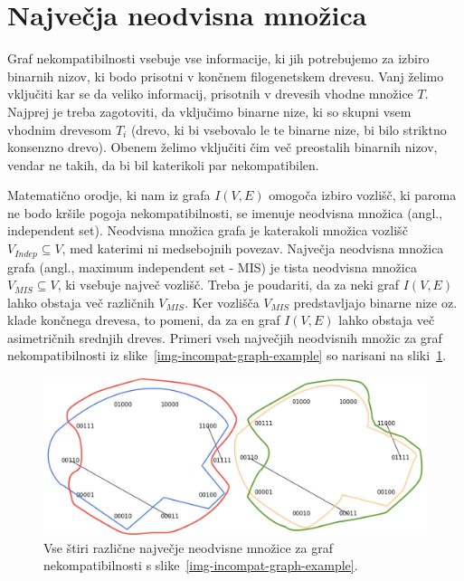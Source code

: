 \documentclass[a4paper, 12pt]{book}
\begin{document}
\section{Največja neodvisna množica}
Graf nekompatibilnosti vsebuje vse informacije, ki jih potrebujemo za izbiro 
binarnih nizov, ki bodo prisotni v končnem filogenetskem drevesu. Vanj želimo 
vključiti kar se da veliko informacij, prisotnih v drevesih vhodne množice $T$. 
Najprej je treba zagotoviti, da vključimo binarne nize, ki so skupni vsem 
vhodnim drevesom $T_i$ (drevo, ki bi vsebovalo le te binarne nize, bi bilo 
striktno konsenzno drevo). Obenem želimo vključiti čim več preostalih binarnih 
nizov, vendar ne takih, da bi bil katerikoli par nekompatibilen. 

Matematično orodje, ki nam iz grafa $I(V, E)$ omogoča izbiro vozlišč, ki paroma 
ne bodo kršile pogoja nekompatibilnosti, se imenuje neodvisna množica 
(angl., independent set). Neodvisna množica grafa je katerakoli množica vozlišč 
$V_{Indep} \subseteq V$, med katerimi ni medsebojnih povezav. Največja neodvisna 
množica grafa (angl., maximum independent set - MIS) je tista neodvisna množica 
$V_{MIS} \subseteq V$, ki vsebuje največ vozlišč. Treba je poudariti, da za 
neki graf $I(V, E)$ lahko obstaja več različnih $V_{MIS}$. Ker vozlišča $V_{MIS}$ 
predstavljajo binarne nize oz. klade končnega drevesa, to pomeni, da za en graf 
$I(V, E)$ lahko obstaja več asimetričnih srednjih dreves. Primeri
vseh največjih neodvisnih množic za graf nekompatibilnosti iz 
slike~\ref{img-incompat-graph-example} so narisani na 
sliki~\ref{img-mis-examples}.

\begin{figure}
	\begin{center}
		\includegraphics[scale=0.43]{gfx/incompat_graph_all.png}
	\end{center}
	\caption{
		Vse štiri različne največje neodvisne množice za graf nekompatibilnosti 
		s slike~\ref{img-incompat-graph-example}.
	}
	\label{img-mis-examples}
\end{figure}
\end{document}
